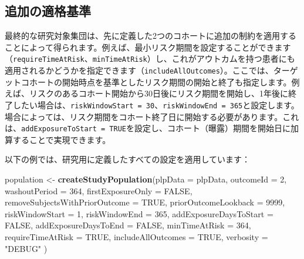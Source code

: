 \documentclass[
  11pt]{book}
\newenvironment{Shaded}{\begin{snugshade}}{\end{snugshade}}
\newcommand{\AttributeTok}[1]{\textcolor[rgb]{0.13,0.29,0.53}{#1}}
\newcommand{\ConstantTok}[1]{\textcolor[rgb]{0.56,0.35,0.01}{#1}}
\newcommand{\DecValTok}[1]{\textcolor[rgb]{0.00,0.00,0.81}{#1}}
\newcommand{\FunctionTok}[1]{\textcolor[rgb]{0.13,0.29,0.53}{\textbf{#1}}}
\newcommand{\NormalTok}[1]{#1}
\newcommand{\OtherTok}[1]{\textcolor[rgb]{0.56,0.35,0.01}{#1}}
\newcommand{\StringTok}[1]{\textcolor[rgb]{0.31,0.60,0.02}{#1}}
\theoremstyle{definition}
\theoremstyle{definition}
\theoremstyle{definition}
\theoremstyle{definition}
\theoremstyle{remark}
\begin{document}
\subsection{追加の適格基準}\label{ux8ffdux52a0ux306eux9069ux683cux57faux6e96}

最終的な研究対象集団は、先に定義した2つのコホートに追加の制約を適用することによって得られます。例えば、最小リスク期間を設定することができます（\texttt{requireTimeAtRisk}、\texttt{minTimeAtRisk}）し、これがアウトカムを持つ患者にも適用されるかどうかを指定できます（\texttt{includeAllOutcomes}）。ここでは、ターゲットコホートの開始時点を基準としたリスク期間の開始と終了も指定します。例えば、リスクのあるコホート開始から30日後にリスク期間を開始し、1年後に終了したい場合は、\texttt{riskWindowStart\ =\ 30}、\texttt{riskWindowEnd\ =\ 365}と設定します。場合によっては、リスク期間をコホート終了日に開始する必要があります。これは、\texttt{addExposureToStart\ =\ TRUE}を設定し、コホート（曝露）期間を開始日に加算することで実現できます。

以下の例では、研究用に定義したすべての設定を適用しています：

\begin{Shaded}
\begin{Highlighting}[]
\NormalTok{population }\OtherTok{\textless{}{-}} \FunctionTok{createStudyPopulation}\NormalTok{(}\AttributeTok{plpData =}\NormalTok{ plpData,}
                                    \AttributeTok{outcomeId =} \DecValTok{2}\NormalTok{,}
                                    \AttributeTok{washoutPeriod =} \DecValTok{364}\NormalTok{,}
                                    \AttributeTok{firstExposureOnly =} \ConstantTok{FALSE}\NormalTok{,}
                                    \AttributeTok{removeSubjectsWithPriorOutcome =} \ConstantTok{TRUE}\NormalTok{,}
                                    \AttributeTok{priorOutcomeLookback =} \DecValTok{9999}\NormalTok{,}
                                    \AttributeTok{riskWindowStart =} \DecValTok{1}\NormalTok{,}
                                    \AttributeTok{riskWindowEnd =} \DecValTok{365}\NormalTok{,}
                                    \AttributeTok{addExposureDaysToStart =} \ConstantTok{FALSE}\NormalTok{,}
                                    \AttributeTok{addExposureDaysToEnd =} \ConstantTok{FALSE}\NormalTok{,}
                                    \AttributeTok{minTimeAtRisk =} \DecValTok{364}\NormalTok{,}
                                    \AttributeTok{requireTimeAtRisk =} \ConstantTok{TRUE}\NormalTok{,}
                                    \AttributeTok{includeAllOutcomes =} \ConstantTok{TRUE}\NormalTok{,}
                                    \AttributeTok{verbosity =} \StringTok{"DEBUG"}
\NormalTok{)}
\end{Highlighting}
\end{Shaded}
\end{document}
